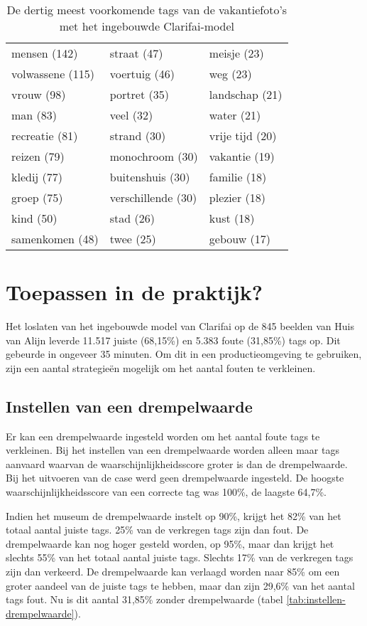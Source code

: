 \begin{table}
	\centering
	\begin{tabular}{*{3}{l}}
		mensen (142) & straat (47) & meisje (23) \\
		volwassene (115) & voertuig (46) & weg (23) \\
		vrouw (98) & portret (35) & landschap (21) \\
		man (83) & veel (32) & water (21) \\
		recreatie (81) & strand (30) & vrije tijd (20) \\
		reizen (79) & monochroom (30) & vakantie (19) \\
		kledij (77) & buitenshuis (30) & familie (18) \\
		groep (75) & verschillende (30) & plezier (18) \\
		kind (50) & stad (26) & kust (18) \\
		samenkomen (48) & twee (25) & gebouw (17) \\
	\end{tabular}
	\caption{De dertig meest voorkomende tags van de vakantiefoto's met het ingebouwde Clarifai-model}
	\label{tab:30-termen-vakantie}
\end{table}

\section{Toepassen in de praktijk?}
\label{sec:ingebouwd-toepassen-praktijk}

Het loslaten van het ingebouwde model van Clarifai op de 845 beelden van Huis van Alijn leverde 11.517 juiste (68,15\%) en 5.383 foute (31,85\%) tags op. Dit gebeurde in ongeveer 35 minuten. Om dit in een productieomgeving te gebruiken, zijn een aantal strategieën mogelijk om het aantal fouten te verkleinen.

\subsection{Instellen van een drempelwaarde}

Er kan een drempelwaarde ingesteld worden om het aantal foute tags te verkleinen. Bij het instellen van een drempelwaarde worden alleen maar tags aanvaard waarvan de waarschijnlijkheidsscore groter is dan de drempelwaarde. Bij het uitvoeren van de case werd geen drempelwaarde ingesteld. De hoogste waarschijnlijkheidsscore van een correcte tag was 100\%, de laagste 64,7\%.

Indien het museum de drempelwaarde instelt op 90\%, krijgt het 82\% van het totaal aantal juiste tags. 25\% van de verkregen tags zijn dan fout. De drempelwaarde kan nog hoger gesteld worden, op 95\%, maar dan krijgt het slechts 55\% van het totaal aantal juiste tags. Slechts 17\% van de verkregen tags zijn dan verkeerd. De drempelwaarde kan verlaagd worden naar 85\% om een groter aandeel van de juiste tags te hebben, maar dan zijn 29,6\% van het aantal tags fout. Nu is dit aantal 31,85\% zonder drempelwaarde (tabel \ref{tab:instellen-drempelwaarde}).

